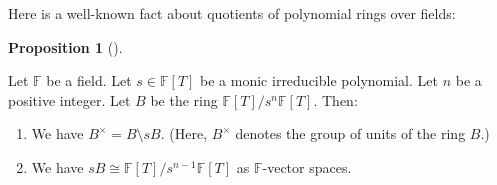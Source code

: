 \documentclass[numbers=enddot,12pt,final,onecolumn,notitlepage]{scrartcl}%
\theoremstyle{definition}
\newtheorem{prop}[theo]{Proposition}
\newenvironment{proposition}[1][]
{\begin{prop}[#1]\begin{leftbar}}
{\end{leftbar}\end{prop}}
\begin{document}
Here is a well-known fact about quotients of polynomial rings over fields:

\begin{proposition}
\label{prop.FT.modsn}Let $\mathbb{F}$ be a field. Let $s\in\mathbb{F}\left[
T\right]  $ be a monic irreducible polynomial. Let $n$ be a positive integer.
Let $B$ be the ring $\mathbb{F}\left[  T\right]  /s^{n}\mathbb{F}\left[
T\right]  $. Then:

\begin{enumerate}
\item[\textbf{(a)}] We have $B^{\times}=B\setminus sB$. (Here, $B^{\times}$
denotes the group of units of the ring $B$.)

\item[\textbf{(b)}] We have $sB\cong\mathbb{F}\left[  T\right]  /s^{n-1}%
\mathbb{F}\left[  T\right]  $ as $\mathbb{F}$-vector spaces.
\end{enumerate}
\end{proposition}
\end{document}
